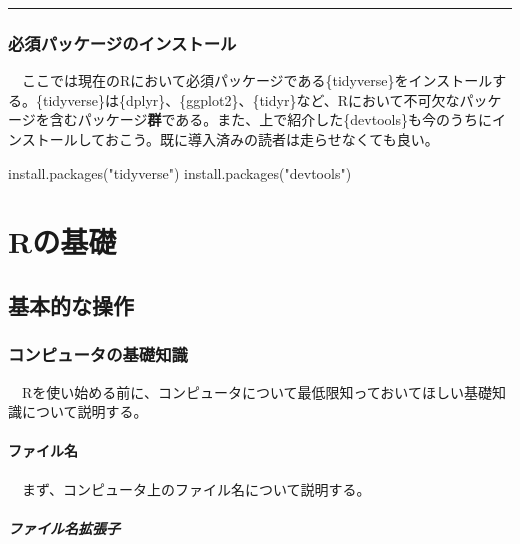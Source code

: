 \documentclass[
  a4paper,
  pandoc,
  ja=standard,
  jafont=haranoaji]{bxjsbook}
\newenvironment{Shaded}{\begin{snugshade}}{\end{snugshade}}
\newcommand{\FunctionTok}[1]{\textcolor[rgb]{0.28,0.35,0.67}{#1}}
\newcommand{\NormalTok}[1]{\textcolor[rgb]{0.00,0.48,0.65}{#1}}
\newcommand{\StringTok}[1]{\textcolor[rgb]{0.13,0.47,0.30}{#1}}
\begin{document}
\begin{center}\rule{0.5\linewidth}{0.5pt}\end{center}

\hypertarget{sec-packages_tidyverse}{%
\section{必須パッケージのインストール}\label{sec-packages_tidyverse}}

　ここでは現在のRにおいて必須パッケージである\{tidyverse\}をインストールする。\{tidyverse\}は\{dplyr\}、\{ggplot2\}、\{tidyr\}など、Rにおいて不可欠なパッケージを含むパッケージ\textbf{群}である。また、上で紹介した\{devtools\}も今のうちにインストールしておこう。既に導入済みの読者は走らせなくても良い。

\begin{Shaded}
\begin{Highlighting}[numbers=left,,]
\FunctionTok{install.packages}\NormalTok{(}\StringTok{"tidyverse"}\NormalTok{)}
\FunctionTok{install.packages}\NormalTok{(}\StringTok{"devtools"}\NormalTok{)}
\end{Highlighting}
\end{Shaded}

\part{Rの基礎}

\hypertarget{sec-rbasic}{%
\chapter{基本的な操作}\label{sec-rbasic}}

\hypertarget{sec-rbasic_compbasic}{%
\section{コンピュータの基礎知識}\label{sec-rbasic_compbasic}}

　Rを使い始める前に、コンピュータについて最低限知っておいてほしい基礎知識について説明する。

\hypertarget{ux30d5ux30a1ux30a4ux30ebux540d}{%
\subsection{ファイル名}\label{ux30d5ux30a1ux30a4ux30ebux540d}}

　まず、コンピュータ上のファイル名について説明する。

\hypertarget{ux30d5ux30a1ux30a4ux30ebux540dux62e1ux5f35ux5b50}{%
\subsubsection{ファイル名拡張子}\label{ux30d5ux30a1ux30a4ux30ebux540dux62e1ux5f35ux5b50}}
\end{document}
